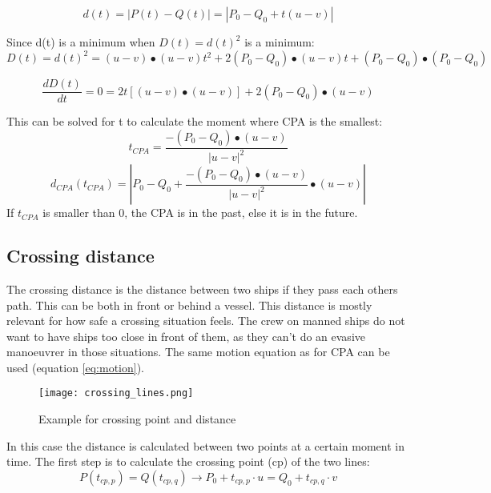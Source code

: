 \begin{equation}
	d(t) = |P(t) - Q(t)| = |P_0 - Q_0 + t (u - v)|
\end{equation}

Since d(t) is a minimum when $D(t) = d(t)^2$ is a minimum:
\begin{equation}
	D(t) = d(t)^2 = (u - v) \bullet (u - v) t^2 + 2 (P_0 - Q_0) \bullet (u - v) t + (P_0 - Q_0) \bullet (P_0 - Q_0)
\end{equation}

\begin{equation}
\frac{d D(t)}{dt} = 0 = 2t[(u - v) \bullet (u-v)] + 2 (P_0 - Q_0) \bullet (u - v)
\end{equation}

This can be solved for t to calculate the moment where CPA is the smallest:
\begin{equation}
	t_{CPA} = \frac{-(P_0 - Q_0) \bullet (u - v)}{|u - v|^2}
\end{equation}
\begin{equation}
	d_{CPA}(t_{CPA}) = |P_0 - Q_0 + \frac{-(P_0 - Q_0) \bullet (u - v)}{|u - v|^2} \bullet (u - v)|
\end{equation}
If $t_{CPA}$ is smaller than 0, the CPA is in the past, else it is in the future.

\subsection{Crossing distance}
The crossing distance is the distance between two ships if they pass each others path. This can be both in front or behind a vessel. This distance is mostly relevant for how safe a crossing situation feels. The crew on manned ships do not want to have ships too close in front of them, as they can't do an evasive manoeuvrer in those situations. The same motion equation as for CPA can be used (equation \ref{eq:motion}). 

\begin{figure}[h]
	\centering
	\texttt{[image: crossing\_lines.png]}
	\caption{Example for crossing point and distance}
	\label{fig:CPA}
\end{figure}

In this case the distance is calculated between two points at a certain moment in time. The first step is to calculate the crossing point (cp) of the two lines:
\begin{equation}
	P(t_{cp,p}) = Q(t_{cp,q}) \rightarrow P_0 + t_{cp,p} \cdot u = Q_0 + t_{cp,q} \cdot v
\end{equation}

